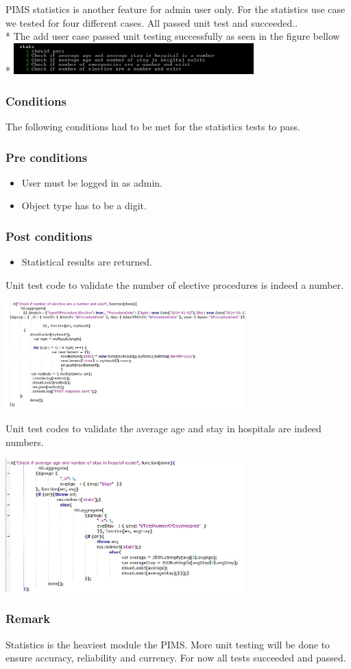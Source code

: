 PIMS statistics is another feature for admin user only. For the statistics use case we tested for four different cases. All passed unit test and succeeded..
\\* 
The add user case passed unit testing successfully as seen in the figure bellow
\\* 
\includegraphics[width=350px]{./Graphics/statsResults}
		
\subsubsection*{Conditions}
The following conditions had to be met for the statistics tests to pass.
	
\subsubsection*{Pre conditions}	
\begin{itemize}
		\item User must be logged in as admin.
		\item Object type has to be a digit.
\end{itemize}	

\subsubsection*{Post conditions}	
\begin{itemize}
		\item Statistical results are returned.
\end{itemize}	

Unit test code to validate the number of elective procedures is indeed a number.	

\includegraphics[width=350px]{./Graphics/StatsChecknumexists}

Unit test codes to validate the average age and stay in hospitals are indeed numbers.	

\includegraphics[width=350px]{./Graphics/averageNumberStats}

\subsubsection*{Remark}
Statistics is the heaviest module the PIMS. More unit testing will be done to ensure accuracy, reliability and currency. For now all tests succeeded and passed.
